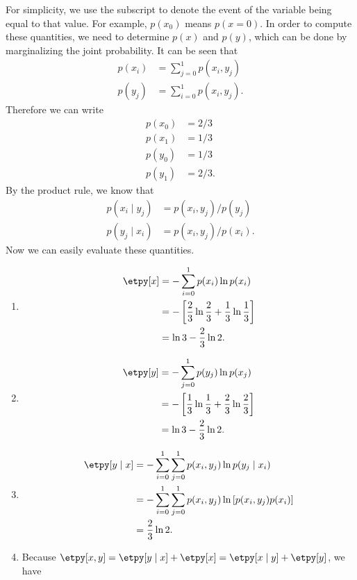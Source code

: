 \begin{answer}{}
	For simplicity, we use the subscript to denote the event of the variable being equal to that value. For example, $p(x_0)$ means $p(x = 0)$. In order to compute these quantities, we need to determine $p(x)$ and $p(y)$, which can be done by marginalizing the joint probability. It can be seen that
	\begin{align}
		p(x_i) &= \sum_{j = 0}^{1} p(x_i, y_j)\\
		p(y_j) &= \sum_{i = 0}^{1} p(x_i, y_j).
	\end{align}
	Therefore we can write
	\begin{align}
		p(x_0) &= 2/3\\
		p(x_1) &= 1/3\\
		p(y_0) &= 1/3\\
		p(y_1) &= 2/3.
	\end{align}
		By the product rule, we know that
	\begin{align}
	p(x_i \mid y_j) &= p(x_i, y_j) / p(y_j)\\
	p(y_j \mid x_i) &= p(x_i, y_j) / p(x_i).
	\end{align}
	Now we can easily evaluate these quantities.
	\begin{enumerate}[label = {\bfseries (\alph*)}]
		\item \begin{align}
			\etpy[x] &= -\sum_{i = 0}^{1} p(x_i) \ln p(x_i)\\
			&= -\left[\frac{2}{3}  \ln \frac{2}{3} + \frac{1}{3}\ln\frac{1}{3} \right]\\
			&= \ln 3 - \frac{2}{3}\ln2.
		\end{align}
		\item \begin{align}
			\etpy[y] &= -\sum_{j = 0}^{1} p(y_j) \ln p(x_j)\\
			&= -\left[\frac{1}{3}\ln \frac{1}{3} + \frac{2}{3}\ln\frac{2}{3} \right]\\
			&= \ln 3 - \frac{2}{3}\ln2.
		\end{align}
		\item \begin{align}
			\etpy[y \mid x] &= -\sum_{i = 0}^{1} \sum_{j = 0}^{1} p(x_i, y_j) \ln p(y_j \mid x_i)\\
			&= -\sum_{i = 0}^{1} \sum_{j = 0}^{1} p(x_i, y_j) \ln \left[p(x_i, y_j)p(x_i)\right]\\
			&= \frac{2}{3}\ln 2.
		\end{align}
		\item Because $\etpy[x, y] = \etpy[y \mid x] + \etpy[x] = \etpy[x \mid y] + \etpy[y]$, we have

\end{enumerate}
\end{answer}
